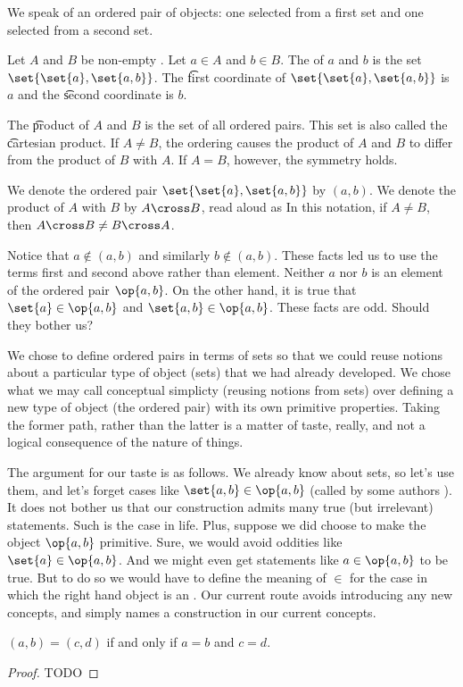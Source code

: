 

We speak of an ordered pair of objects: one selected from a first set and one selected from a second set.


Let $A$ and $B$ be non-empty .
Let $a \in A$ and $b \in B$.
The  of $a$ and $b$ is the set
$\set{\set{a}, \set{a, b}}$.
The \t{first coordinate} of $\set{\set{a}, \set{a, b}}$ is $a$ and the \t{second coordinate} is $b$.

The \t{product} of $A$ and $B$ is the set of all ordered pairs.
This set is also called the \t{cartesian product}.
If $A \neq B$, the ordering causes the product of $A$ and $B$ to differ from the product of
$B$ with $A$.
If $A = B$, however, the symmetry holds.


We denote the ordered pair $\set{\set{a},\set{a,b}}$ by $(a, b)$.
We denote the product of $A$ with $B$ by $A \cross B$, read aloud as 
In this notation, if $A \neq B$, then $A \cross B \neq B \cross A$.


Notice that $a \not\in (a, b)$ and similarly $b \not\in (a, b)$.
These facts led us to use the terms first and second  above rather than element.
Neither $a$ nor $b$ is an element of the ordered pair $\op{a, b}$.
On the other hand, it is true that $\set{a} \in \op{a, b}$ and $\set{a, b} \in \op{a, b}$.
These facts are odd.
Should they bother us?

We chose to define ordered pairs in terms of sets so that we could reuse notions about a particular type of object (sets) that we had already developed.
We chose what we may call conceptual simplicty (reusing notions from sets) over defining a new type of object (the ordered pair) with its own primitive properties.
Taking the former path, rather than the latter is a matter of taste, really, and not a logical consequence of the nature of things.

The argument for our taste is as follows.
We already know about sets, so let's use them, and let's forget cases like $\set{a, b} \in \op{a, b}$ (called by some authors ).
It does not bother us that our construction admits many true (but irrelevant) statements.
Such is the case in life.
Plus, suppose we did choose to make the object
$\op{a, b}$ primitive.
Sure, we would avoid oddities like $\set{a} \in \op{a, b}$.
And we might even get statements like $a \in \op{a, b}$ to be true.
But to do so we would have to define the meaning of $\in$ for the case in which the right hand object is an .
Our current route avoids introducing any new concepts, and simply names a construction in our current concepts.


\begin{prop}
$(a, b) = (c, d)$ if and only if $a = b$ and $c = d$.
  \begin{proof}
    TODO
  \end{proof}
\end{prop}
